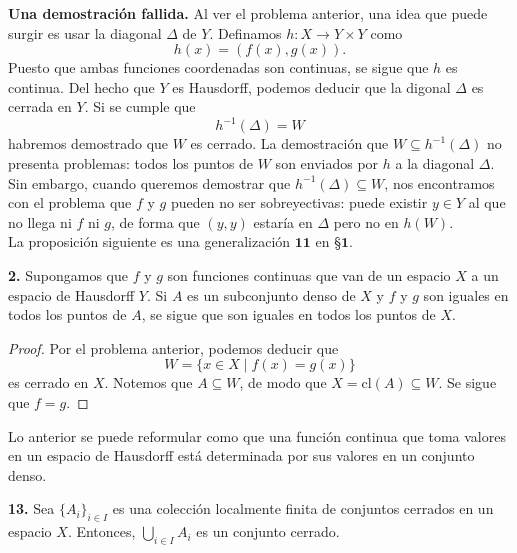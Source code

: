 \documentclass{article}
\begin{document}
\textbf{Una demostración fallida. } Al ver el problema anterior, una idea que puede surgir es usar la diagonal $\Delta$ de $Y$. Definamos $h: X \rightarrow Y \times Y$ como 
$$ h(x) = ( f(x), g(x) ). $$
Puesto que ambas funciones coordenadas son continuas, se sigue que $h$ es continua. Del hecho que $Y$ es Hausdorff, podemos deducir que la digonal $\Delta$ es cerrada en $Y$. Si se cumple que
$$ h^{-1}(\Delta) = W $$
habremos demostrado que $W$ es cerrado. La demostración que $W \subseteq h^{-1}(\Delta)$ no presenta problemas: todos los puntos de $W$ son enviados por $h$ a la diagonal $\Delta$. 
Sin embargo, cuando queremos demostrar que $h^{-1}(\Delta) \subseteq W$, nos encontramos con el problema que $f$ y $g$ pueden no ser sobreyectivas: puede existir $y \in Y$ al que no llega ni $f$ ni $g$, de forma que $(y, y)$ estaría en $\Delta$ pero no en $h(W)$.\\

La proposición siguiente es una generalización $\mathbf{11}$ en §$\mathbf{1}$.

\begin{mybox}
	\textbf{2. } Supongamos que $f$ y $g$ son funciones continuas que van de un espacio $X$ a un espacio de Hausdorff $Y$. Si $A$ es un subconjunto denso de $X$ y $f$ y $g$ son iguales en todos los puntos de $A$, se sigue que son iguales en todos los puntos de $X$. 
\end{mybox}	
\begin{proof}
	Por el problema anterior, podemos deducir que 
	$$ W = \{ x \in X \mid f(x) = g(x) \}$$
	es cerrado en $X$. Notemos que $A \subseteq W$, de modo que $X = \text{cl}(A) \subseteq W$. Se sigue que $f = g$. 
\end{proof}

Lo anterior se puede reformular como que una función continua que toma valores en un espacio de Hausdorff está determinada por sus valores en un conjunto denso. \\

\begin{mybox}
	\textbf{13. } Sea $\{A_{i} \}_{i \in I}$ es una colección localmente finita de conjuntos cerrados en un espacio $X$. Entonces, $\bigcup_{i \in I} A_{i}$ es un conjunto cerrado. 
\end{mybox}	
\end{document}
